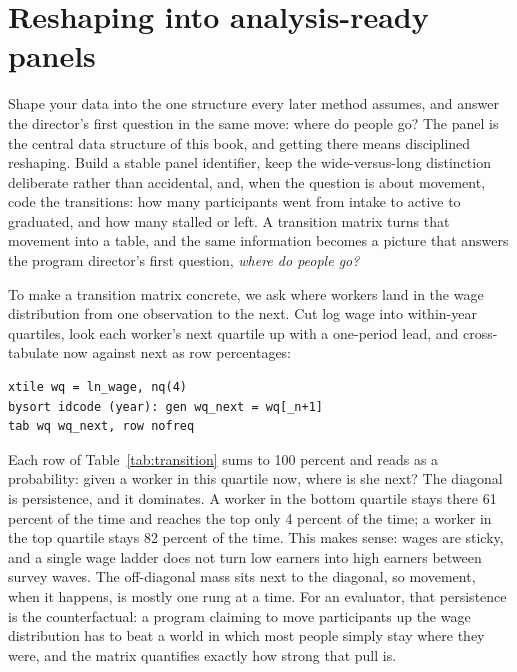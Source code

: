 \documentclass[
    a4paper,
    fontsize=10pt,
    twoside=true,
    numbers=noenddot,
]{kaobook}
\begin{document}
\section{Reshaping into analysis-ready panels}
Shape your data into the one structure every later method assumes, and answer the director's first question in the same move: where do people go? The panel is the central data structure of this book, and getting there means disciplined reshaping. Build a stable panel identifier, keep the wide-versus-long distinction deliberate rather than accidental, and, when the question is about movement, code the transitions: how many participants went from intake to active to graduated, and how many stalled or left. A transition matrix turns that movement into a table, and the same information becomes a picture that answers the program director's first question, \emph{where do people go?}

To make a transition matrix concrete, we ask where workers land in the wage distribution from one observation to the next. Cut log wage into within-year quartiles, look each worker's next quartile up with a one-period lead, and cross-tabulate now against next as row percentages:
{\footnotesize
\begin{verbatim}
xtile wq = ln_wage, nq(4)
bysort idcode (year): gen wq_next = wq[_n+1]
tab wq wq_next, row nofreq
\end{verbatim}
}
Each row of Table~\ref{tab:transition} sums to 100 percent and reads as a probability: given a worker in this quartile now, where is she next? The diagonal is persistence, and it dominates. A worker in the bottom quartile stays there 61 percent of the time and reaches the top only 4 percent of the time; a worker in the top quartile stays 82 percent of the time. This makes sense: wages are sticky, and a single wage ladder does not turn low earners into high earners between survey waves. The off-diagonal mass sits next to the diagonal, so movement, when it happens, is mostly one rung at a time. For an evaluator, that persistence is the counterfactual: a program claiming to move participants up the wage distribution has to beat a world in which most people simply stay where they were, and the matrix quantifies exactly how strong that pull is.
\end{document}

